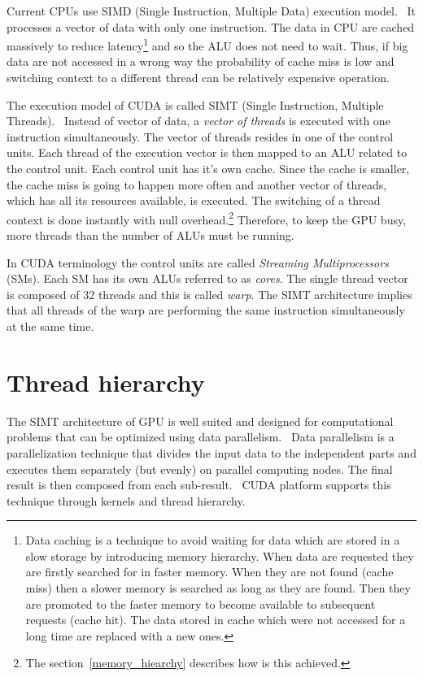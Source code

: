 \documentclass[12pt,twoside]{fithesis2}
\begin{document}
Current CPUs use SIMD (Single Instruction, Multiple Data) execution model.~\cite{professional_cuda} It processes a vector of data with only one instruction. The data in CPU are cached massively to reduce latency\footnote{Data caching is a technique to avoid waiting for data which are stored in a slow storage by introducing memory hierarchy. When data are requested they are firstly searched for in faster memory. When they are not found (cache miss) then a slower memory is searched as long as they are found. Then they are promoted to the faster memory to become available to subsequent requests (cache hit). The data stored in cache which were not accessed for a long time are replaced with a new ones.} and so the ALU does not need to wait. Thus, if big data are not accessed in a wrong way the probability of cache miss is low and switching context to a different thread can be relatively expensive operation.

The execution model of CUDA is called SIMT (Single Instruction, Multiple Threads).~\cite{professional_cuda} Instead of vector of data, a \emph{vector of threads} is executed with one instruction simultaneously. The vector of threads resides in one of the control units. Each thread of the execution vector is then mapped to an ALU related to the control unit. Each control unit has it's own cache. Since the cache is smaller, the cache miss is going to happen more often and another vector of threads, which has all its resources available, is executed. The switching of a thread context is done instantly with null overhead.\footnote{The section~\ref{memory_hiearchy} describes how is this achieved.} Therefore, to keep the GPU busy, more threads than the number of ALUs must be running.

In CUDA terminology the control units are called \emph{Streaming Multiprocessors} (SMs). Each SM has its own ALUs referred to as \emph{cores}. The single thread vector is composed of 32 threads and this is called \emph{warp}. The SIMT architecture implies that all threads of the warp are performing the same instruction simultaneously at the same time.~\cite{cuda_guide}


\section{Thread hierarchy}
\label{thread_hierarchy}

The SIMT architecture of GPU is well suited and designed for computational problems that can be optimized using data parallelism.~\cite{professional_cuda} Data parallelism is a parallelization technique that divides the input data to the independent parts and executes them separately (but evenly) on parallel computing nodes. The final result is then composed from each sub-result.~\cite{data_parallel_algorithms} CUDA platform supports this technique through kernels and thread hierarchy.
\end{document}
